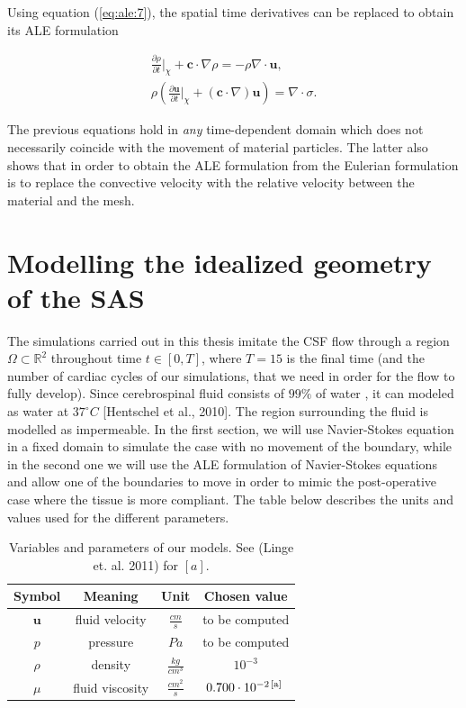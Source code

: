 \documentclass[a4paper,11pt,openright,twoside]{book}
\begin{document}
Using equation (\ref{eq:ale:7}), the spatial time derivatives can be replaced to obtain its ALE formulation

\begin{align}
\frac{\partial \rho}{\partial t} {\Big |}_\chi + \mathbf{c} \cdot \nabla \rho = - \rho \nabla \cdot \mathbf{u}, \\
\rho (\frac{\partial \mathbf{u}}{\partial t} {\Big |}_\chi + (\mathbf{c} \cdot \nabla)\mathbf{u}) = \nabla \cdot \sigma. 
\end{align}

The previous equations hold in \emph{any} time-dependent domain which does not necessarily coincide with the movement of material particles. The latter also shows that in order to obtain the ALE formulation from the Eulerian formulation is to replace the convective velocity with the relative velocity between the material and the mesh.

\newpage

\section{Modelling the idealized geometry of the SAS}
\label{sec:sas}



The simulations carried out in this thesis imitate the CSF flow through a region $\Omega \subset \mathbb{R}^2$ throughout time $t \in [0, T]$, where $T=15$ is the final time (and the number of cardiac cycles of our simulations, that we need in order for the flow to fully develop). Since cerebrospinal fluid consists of $99 \% $ of water \cite{linge1}, it can modeled as water at $37^{\circ} C$ [Hentschel et al., 2010]. The region surrounding the fluid is modelled as impermeable.
In the first section, we will use Navier-Stokes equation in a fixed domain to simulate the case with no movement of the boundary, while in the second one we will use the ALE formulation of Navier-Stokes equations and allow one of the boundaries to move in order to mimic the post-operative case where the tissue is more compliant. The table below describes the units and values used for the different parameters.

\begin{table}[h!]
\begin{center}
\begin{tabular}{| c | c | c | c |}
\hline
\textbf{Symbol} & \textbf{Meaning} & \textbf{Unit} & \textbf{Chosen value} \\
\hline
$\mathbf{u}$ & fluid velocity & $\frac{cm}{s}$ & to be computed \\
\hline
$p$ & pressure & $Pa$ & to be computed \\
\hline
$\rho$ & density & $\frac{kg}{cm^3}$ & $10^{-3}$ \\
\hline
$\mu$ & fluid viscosity & $\frac{cm^2}{s}$ & $0.700 \cdot 10^{-2 \, [\rm a] \, }$ \\
\hline
\end{tabular}
\end{center}
\caption{Variables and parameters of our models. See (Linge et. al. 2011) for $[a]$.}
\end{table}
\end{document}
